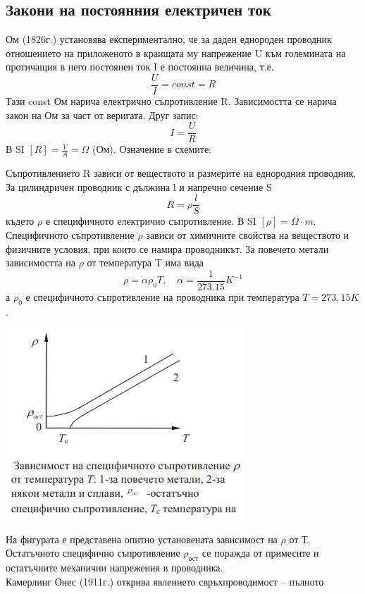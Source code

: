 \documentclass[fleqn, 12pt]{article}
\theoremstyle{definition}
\begin{document}
\subsection{Закони на постоянния електричен ток}
Ом (1826г.) установява експериментално, че за даден еднороден проводник
отношението на приложеното в краищата му напрежение U към големината на
протичащия в него постоянен ток I е постоянна величина, т.е. 
$$\frac{U}{I} = const = R$$
Тази const Ом нарича електрично съпротивление R. Зависимостта се нарича закон на
Ом за част от веригата. Друг запис:
$$I = \frac{U}{R}$$
В SI $[R] = \frac{V}{A} = \Omega$ (Ом). Означение в схемите:
\begin{center}
\end{center}
Съпротивлението R зависи от веществото и размерите на еднородния проводник.
За цилиндричен проводник с дължина l и напречно сечение S
$$R = \rho \frac{l}{S}$$
където $\rho$ е специфичното електрично съпротивление. В SI $[\rho] = \Omega \cdot m$.\\
Специфичното съпротивление $\rho$ зависи от химичните свойства на веществото и
физичните условия, при които се намира проводникът. За повечето
метали зависимостта на $\rho$ от температура T има вида 
$$\rho = \alpha \rho_0 T, \quad \alpha = \frac{1}{273.15} K^{-1}$$
а $\rho_0$ е специфичното съпротивление на проводника при температура $T = 273,15 K$.
\begin{center}
  \includegraphics{Pics/physics/lec6-12-1.png}
\end{center}
На фигурата е представена
опитно установената зависимост на $\rho$
от Т. Остатъчното специфично съпротивление $\rho_{\text{ост}}$ 
се поражда от примесите и остатъчните механични напрежения в проводника. \\
Камерлинг Онес (1911г.) открива явлението свръхпроводимост – пълното
\end{document}
